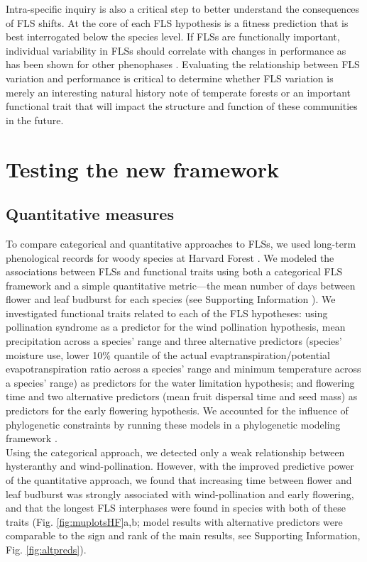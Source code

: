 \documentclass[11pt]{article}
\begin{document}
\noindent Intra-specific inquiry is also a critical step to better understand the consequences of FLS shifts. At the core of each FLS hypothesis is a fitness prediction that is best interrogated below the species level. If FLSs are functionally important, individual variability in FLSs should correlate with changes in performance as has been shown for other phenophases \citep[e.g.][]{Schermer2020}. Evaluating the relationship between FLS variation and performance is critical to determine whether FLS variation is merely an interesting natural history note of temperate forests or an important functional trait that will impact the structure and function of these communities in the future.\\ 

\section*{Testing the new framework}
\subsection*{Quantitative measures}
\noindent To compare categorical and quantitative approaches to FLSs, we used long-term phenological records for woody species at Harvard Forest \citep{OKeefe2015}. We modeled the associations between FLSs and functional traits using both a categorical FLS framework and a simple quantitative metric---the mean number of days between flower and leaf budburst for each species (see Supporting Information ). We investigated functional traits related to each of the FLS hypotheses: using pollination syndrome as a predictor for the wind pollination hypothesis, mean precipitation across a species' range and three alternative predictors (species' moisture use, lower 10\% quantile of the actual evaptranspiration/potential evapotranspiration ratio across a species' range and minimum temperature across a species' range) as predictors for the water limitation hypothesis; and flowering time and two alternative predictors (mean fruit dispersal time and seed mass) as predictors for the early flowering hypothesis. We accounted for the influence of phylogenetic constraints by running these models in a phylogenetic modeling framework \citep{Ives2010}.\\ 

\noindent Using the categorical approach, we detected only a weak relationship between hysteranthy and wind-pollination. However, with the improved predictive power of the quantitative approach, we found that increasing time between flower and leaf budburst was strongly associated with wind-pollination and early flowering, and that the longest FLS interphases were found in species with both of these traits (Fig. \ref{fig:muplotsHF}a,b; model results with alternative predictors were comparable to the sign and rank of the main results, see Supporting Information, Fig. \ref{fig:altpreds}).\\  
\end{document}
